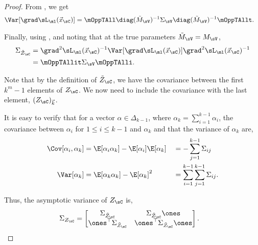 \begin{proof}
  From , we get
  \begin{align*}
    \Var [\grad \sL_\ml(\vec x_\sC)] &= \mOppTAll \diag(\tilde M_\sV)^{-1} \Sigma_\sV \diag(\tilde M_\sV)^{-1} \mOppTAllt .
  \end{align*}

  Finally, using , and noting that at the true parameters $\tilde M_\sV = M_\sV$, 
  \begin{align*}
    \Sigma_{\tilde Z_\sC} 
      &= \grad^2 \sL_\ml(\vec x_\sC)^{-1} \Var [\grad \sL_\ml(\vec x_\sC)] \grad^2 \sL_\ml(\vec x_\sC)^{-1} \\
      &= \mOppTAllit \Sigma_\sV \mOppTAlli.
  \end{align*}

Note that by the definition of $\tilde Z_\sC$, we have the covariance
between the first $k^m - 1$ elements of $Z_\sC$. 
We now need to include the covariance with the last element,
  $(Z_\sC)_{\vec k}$. 

It is easy to verify that for a vector $\alpha \in \Delta_{k-1}$, where
  $\alpha_k = \sum_{i=1}^{k-1} \alpha_i$, the covariance between
  $\alpha_i$ for $1 \le i \le k-1$ and $\alpha_k$ and that the variance
  of $\alpha_k$ are,
\begin{align*}
  \Cov[ \alpha_i, \alpha_k ] 
    &= \E[ \alpha_i \alpha_k ] - \E[ \alpha_i ]\E[ \alpha_k ] 
    &&= - \sum_{j=1}^{k-1} \Sigma_{ij} \\
  \Var[ \alpha_k ] 
    &= \E[ \alpha_k \alpha_k ] - \E[ \alpha_k ]^2 
    &&= \sum_{i=1}^{k-1} \sum_{j=1}^{k-1} \Sigma_{ij}.
\end{align*}

Thus, the asymptotic variance of $Z_\sC$ is,
\begin{align*}
    \Sigma_{Z_\sC} &= 
    \begin{bmatrix}
    \Sigma_{\tilde Z_\sC} & \Sigma_{\tilde Z_\sC} \ones \\
    \ones^\top \Sigma_{\tilde Z_\sC} & \ones^\top \Sigma_{\tilde Z_\sC} \ones
    \end{bmatrix}.
\end{align*}



\end{proof}

